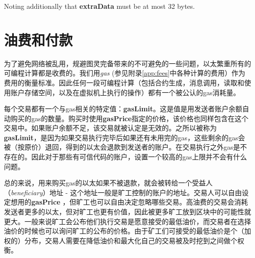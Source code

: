\documentclass[UTF8,nofonts]{ctexart}
\begin{document}
\begin{multicols}{2}
Noting additionally that \textbf{extraData} must be at most 32 bytes.


\section{油费和付款} \label{ch:payment}

为了避免网络被乱用，规避图灵完备带来的不可避免的一些问题，以太繁重所有的可编程计算都是收费的。我们用\textit{gas} (参见附录\ref{app:fees}中各种计算的费用）作为费用的衡量标准。因此任何一段可编程计算（包括合约生成，消息调用，读取和使用账户存储空间，以及在虚拟机上执行的操作）都有一个被公认的gas消耗量。

每个交易都有一个与gas相关的特定值：\textbf{gasLimit}。这是值是用发送者账户余额自动购买的gas的数量。购买时使用\textbf{gasPrice}指定的价格，该价格也同样包含在这个交易中。如果账户余额不足，该交易就被认定是无效的。之所以被称为\textbf{gasLimit}，是因为如果交易执行完毕后如果还有未用完的gas，这些剩余的gas会被（按原价）退回，得到的以太会退款到发送者的账户。在交易执行之外gas是不存在的。因此对于那些有可信代码的账户，设置一个较高的gas上限并不会有什么问题。



总的来说，用来购买gas的以太如果不被退款，就会被转给一个受益人（\textit{beneficiary}）地址 - 这个地址一般是旷工控制的账户的地址。交易人可以自由设定想用的\textbf{gasPrice} ，但旷工也可以自由决定忽略哪些交易。高油费的交易会消耗发送者更多的以太，但对旷工也更有价值，因此被更多旷工放到区块中的可能性就更大。一般来说旷工会公布他们执行交易是愿意接受的最低油价，而交易者在选择油价的时候也可以询问旷工的公布的价格。由于矿工们可接受的最低油价是个（加权的）分布，交易人需要在降低油价和最大化自己的交易被及时挖到之间做个权衡。






\end{multicols}
\end{document}
